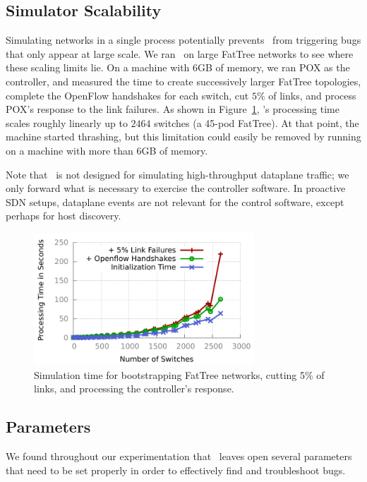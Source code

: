\subsection{Simulator Scalability}

Simulating networks in a single process potentially prevents \projectname~from
triggering bugs that only appear at large scale. We ran
\projectname~on large FatTree networks to see where these scaling limits lie.
On a machine with 6GB of memory, we ran POX as the controller, and measured the
time to create successively larger FatTree
topologies, complete the OpenFlow handshakes for each switch,
cut $5\%$ of links, and process POX's response to the link failures. As shown in
Figure~\ref{fig:scaling}, \projectname's processing time scales roughly
linearly up to $2464$ switches (a 45-pod FatTree). At that point, the machine
started thrashing, but this limitation could easily be removed by running on a
machine with more than 6GB of memory.

Note that \projectname~is not designed for simulating high-throughput dataplane
traffic; we only forward what is necessary to exercise the controller
software. In proactive SDN setups, dataplane events are not
relevant for the control software, except perhaps for host discovery.

\begin{figure}[t]
    \includegraphics[width=3.25in]{../graphs/scalability/scaling.pdf}
    \caption[]{\label{fig:scaling} Simulation time for bootstrapping FatTree
    networks, cutting 5\% of links, and processing the controller's response.}
\end{figure}

\subsection{Parameters}
\label{subsec:params}

We found throughout our experimentation that \projectname~leaves open several
parameters that need to be set properly in order to effectively find and troubleshoot bugs.

